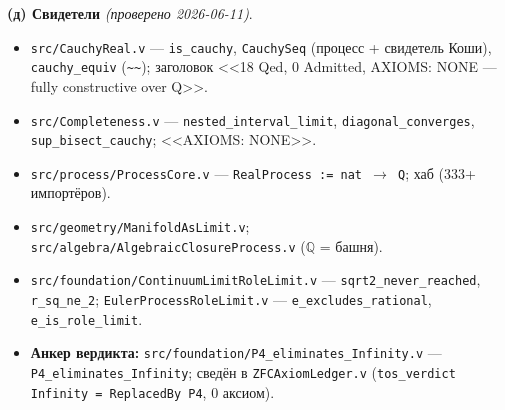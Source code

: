 \documentclass[11pt,a4paper]{article}
\begin{document}
\textbf{(д) Свидетели} \emph{(проверено 2026-06-11)}.
\begin{itemize}
\item \texttt{src/\allowbreak{}Cauchy\allowbreak{}Real.v} --- \texttt{is\_\allowbreak{}cauchy}, \texttt{Cauchy\allowbreak{}Seq} (процесс + свидетель Коши), \texttt{cauchy\_\allowbreak{}equiv} (\texttt{\textasciitilde{}\textasciitilde{}}); заголовок <<18 Qed, 0 Admitted, AXIOMS: NONE --- fully constructive over Q>>.
\item \texttt{src/\allowbreak{}Completeness.v} --- \texttt{nested\_\allowbreak{}interval\_\allowbreak{}limit}, \texttt{diagonal\_\allowbreak{}converges}, \texttt{sup\_\allowbreak{}bisect\_\allowbreak{}cauchy}; <<AXIOMS: NONE>>.
\item \texttt{src/\allowbreak{}process/\allowbreak{}Process\allowbreak{}Core.v} --- \texttt{Real\allowbreak{}Process := nat $\to$ Q}; хаб (333+ импортёров).
\item \texttt{src/\allowbreak{}geometry/\allowbreak{}Manifold\allowbreak{}As\allowbreak{}Limit.v}; \texttt{src/\allowbreak{}algebra/\allowbreak{}Algebraic\allowbreak{}Closure\allowbreak{}Process.v} ($\mathbb{Q}$ = башня).
\item \texttt{src/\allowbreak{}foundation/\allowbreak{}Continuum\allowbreak{}Limit\allowbreak{}Role\allowbreak{}Limit.v} --- \texttt{sqrt2\_\allowbreak{}never\_\allowbreak{}reached}, \texttt{r\_\allowbreak{}sq\_\allowbreak{}ne\_\allowbreak{}2}; \texttt{Euler\allowbreak{}Process\allowbreak{}Role\allowbreak{}Limit.v} --- \texttt{e\_\allowbreak{}excludes\_\allowbreak{}rational}, \texttt{e\_\allowbreak{}is\_\allowbreak{}role\_\allowbreak{}limit}.
\item \textbf{Анкер вердикта:} \texttt{src/\allowbreak{}foundation/\allowbreak{}P4\_\allowbreak{}eliminates\_\allowbreak{}Infinity.v} --- \texttt{P4\_\allowbreak{}eliminates\_\allowbreak{}Infinity}; сведён в \texttt{ZFCAxiom\allowbreak{}Ledger.v} (\texttt{tos\_\allowbreak{}verdict Infinity = Replaced\allowbreak{}By P4}, 0 аксиом).
\end{itemize}
\end{document}
